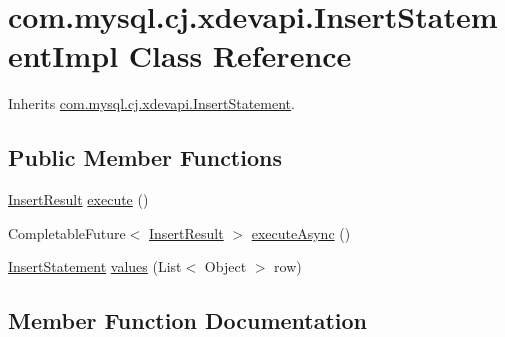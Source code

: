 \hypertarget{classcom_1_1mysql_1_1cj_1_1xdevapi_1_1_insert_statement_impl}{}\section{com.\+mysql.\+cj.\+xdevapi.\+Insert\+Statement\+Impl Class Reference}
\label{classcom_1_1mysql_1_1cj_1_1xdevapi_1_1_insert_statement_impl}


Inherits \mbox{\hyperlink{interfacecom_1_1mysql_1_1cj_1_1xdevapi_1_1_insert_statement}{com.\+mysql.\+cj.\+xdevapi.\+Insert\+Statement}}.

\subsection*{Public Member Functions}
\begin{DoxyCompactItemize}
\item 
\mbox{\hyperlink{interfacecom_1_1mysql_1_1cj_1_1xdevapi_1_1_insert_result}{Insert\+Result}} \mbox{\hyperlink{classcom_1_1mysql_1_1cj_1_1xdevapi_1_1_insert_statement_impl_ae56a1e4524afbd143bd7b172da5a958d}{execute}} ()
\item 
Completable\+Future$<$ \mbox{\hyperlink{interfacecom_1_1mysql_1_1cj_1_1xdevapi_1_1_insert_result}{Insert\+Result}} $>$ \mbox{\hyperlink{classcom_1_1mysql_1_1cj_1_1xdevapi_1_1_insert_statement_impl_a4785f26555304b8f166252956daebda1}{execute\+Async}} ()
\item 
\mbox{\hyperlink{interfacecom_1_1mysql_1_1cj_1_1xdevapi_1_1_insert_statement}{Insert\+Statement}} \mbox{\hyperlink{classcom_1_1mysql_1_1cj_1_1xdevapi_1_1_insert_statement_impl_a22848b1b53273551d2c4ce65e2c237de}{values}} (List$<$ Object $>$ row)
\end{DoxyCompactItemize}


\subsection{Member Function Documentation}
\mbox{\label{classcom_1_1mysql_1_1cj_1_1xdevapi_1_1_insert_statement_impl_ae56a1e4524afbd143bd7b172da5a958d}} 
